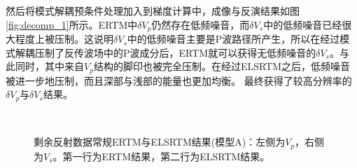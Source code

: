 然后将模式解耦预条件处理加入到梯度计算中，成像与反演结果如图\ref{fig:decomp_1}所示。ERTM中$\delta
V_p$仍然存在低频噪音，而$\delta
V_s$中的低频噪音已经很大程度上被压制。这说明$\delta
V_s$中的低频噪音主要是P波路径所产生，所以在经过模式解耦压制了反传波场中的P波成分后，ERTM就可以获得无低频噪音的$\delta
V_s$。与此同时，其中来自$V_p$结构的脚印也被完全压制。在经过ELSRTM之后，低频噪音被进一步地压制，而且深部与浅部的能量也更加均衡。
最终获得了较高分辨率的$\delta V_p$与$\delta V_s$结果。
\begin{figure}[!htb]
   \centering
   \\
   \caption{剩余反射数据常规ERTM与ELSRTM结果(模型A)：左侧为$V_p$，右侧为$V_s$。第一行为ERTM结果，第二行为ELSRTM结果。}
   \label{fig:node_1_refl}
\end{figure}

